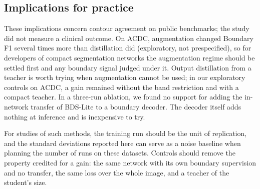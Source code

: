 \documentclass[fleqn,10pt,lineno]{wlpeerj}
\begin{document}
\subsection*{Implications for practice}
These implications concern contour agreement on public benchmarks; the study did not measure a clinical outcome. On ACDC, augmentation changed Boundary F1 several times more than distillation did (exploratory, not prespecified), so for developers of compact segmentation networks the augmentation regime should be settled first and any boundary signal judged under it. Output distillation from a teacher is worth trying when augmentation cannot be used; in our exploratory controls on ACDC, a gain remained without the band restriction and with a compact teacher. In a three-run ablation, we found no support for adding the in-network transfer of BDS-Lite to a boundary decoder. The decoder itself adds nothing at inference and is inexpensive to try.

For studies of such methods, the training run should be the unit of replication, and the standard deviations reported here can serve as a noise baseline when planning the number of runs on these datasets. Controls should remove the property credited for a gain: the same network with its own boundary supervision and no transfer, the same loss over the whole image, and a teacher of the student's size.
\end{document}
